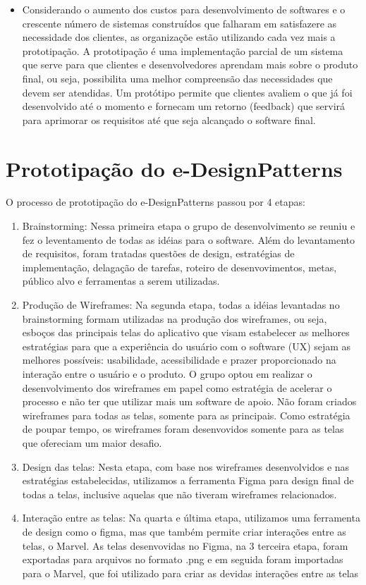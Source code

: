 \begin{itemize}
	\item Considerando o aumento dos custos para desenvolvimento de softwares e o crescente número de sistemas construídos que falharam em satisfazere as necessidade dos clientes, as organizaçõe estão utilizando cada vez mais a prototipação. A prototipação é  uma implementação parcial de um sistema que serve para que clientes e desenvolvedores aprendam mais sobre o produto final, ou seja, possibilita uma melhor compreensão das necessidades que devem ser atendidas. Um protótipo permite que clientes avaliem o que já foi desenvolvido até o momento e fornecam um retorno (feedback) que servirá para aprimorar os requisitos até que seja alcançado o software final. 
\end{itemize}

\section{Prototipação do e-DesignPatterns}

O processo de prototipação do e-DesignPatterns passou por 4 etapas:

\begin{enumerate}
	\item Brainstorming: Nessa primeira etapa o grupo de desenvolvimento se reuniu e fez o leventamento de todas as idéias para o software. Além do levantamento de requisitos, foram tratadas questões de design, estratégias de implementação, delagação de tarefas, roteiro de desenvovimentos, metas, público alvo e ferramentas a serem utilizadas. 
	\item Produção de Wireframes: Na segunda etapa, todas a idéias levantadas no brainstorming formam utilizadas na produção dos wireframes, ou seja, esboços das principais telas do aplicativo que visam estabelecer as melhores estratégias para que a experiência do usuário com o software (UX) sejam as melhores possíveis: usabilidade, acessibilidade e prazer proporcionado na interação entre o usuário e o produto. O grupo optou em realizar o desenvolvimento dos wireframes em papel como estratégia de acelerar o processo e não ter que utilizar mais um software de apoio. Não foram criados wireframes para todas as telas, somente para as principais. Como estratégia de poupar tempo, os wireframes foram desenvovidos somente para as telas que ofereciam um maior desafio.
	\item Design das telas: Nesta etapa, com base nos wireframes desenvolvidos e nas estratégias estabelecidas, utilizamos a ferramenta Figma para design final de todas a telas, inclusive aquelas que não tiveram wireframes relacionados. 
	\item Interação entre as telas: Na quarta e última etapa, utilizamos uma ferramenta de design como o figma, mas que também permite criar interações entre as telas, o Marvel. As telas desenvovidas no Figma, na 3 terceira etapa, foram exportadas para arquivos no formato .png e em seguida foram importadas para o Marvel, que foi utilizado para criar as devidas interações entre as telas
\end{enumerate}


